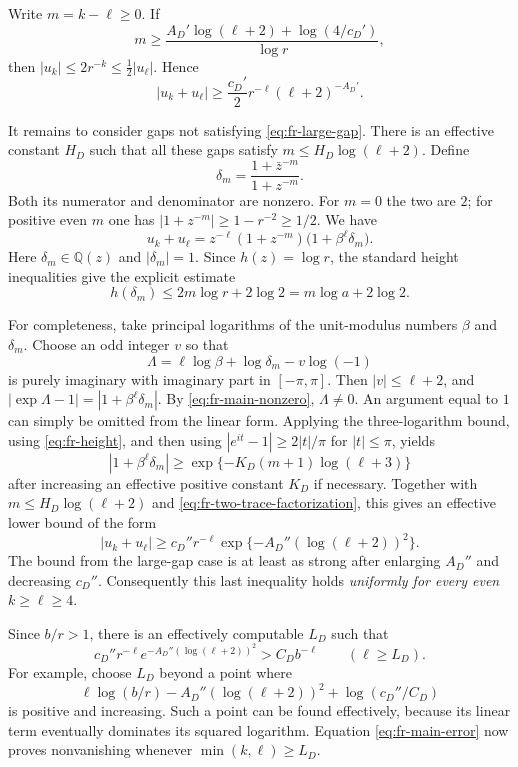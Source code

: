 \documentclass[11pt]{article}
\begin{document}
Write $m=k-\ell\geq0$.  If
\begin{equation}
\label{eq:fr-large-gap}
 m\geq\frac{A_D'\log(\ell+2)+\log(4/c_D')}{\log r},
\end{equation}
then $|u_k|\leq2r^{-k}\leq\tfrac12|u_\ell|$.  Hence
\[
 |u_k+u_\ell|
 \geq\frac{c_D'}2r^{-\ell}(\ell+2)^{-A_D'}.
\]

It remains to consider gaps not satisfying \eqref{eq:fr-large-gap}.
There is an effective constant $H_D$ such that all these gaps satisfy
$m\leq H_D\log(\ell+2)$.  Define
\[
 \delta_m=\frac{1+\bar z^{-m}}{1+z^{-m}}.
\]
Both its numerator and denominator are nonzero.  For $m=0$ the two
are $2$; for positive even $m$ one has
$|1+z^{-m}|\geq1-r^{-2}\geq1/2$.  We have
\begin{equation}
\label{eq:fr-two-trace-factorization}
 u_k+u_\ell
 =z^{-\ell}(1+z^{-m})\bigl(1+\beta^\ell\delta_m\bigr).
\end{equation}
Here $\delta_m\in\mathbb Q(z)$ and $|\delta_m|=1$.
Since $h(z)=\log r$, the standard height inequalities give the explicit
estimate
\begin{equation}
\label{eq:fr-height}
 h(\delta_m)\leq2m\log r+2\log2
 =m\log a+2\log2.
\end{equation}

For completeness, take principal logarithms of the unit-modulus numbers
$\beta$ and $\delta_m$.  Choose an odd integer $v$ so that
\[
 \Lambda=\ell\log\beta+\log\delta_m-v\log(-1)
\]
is purely imaginary with imaginary part in $[-\pi,\pi]$.
Then $|v|\leq\ell+2$, and
$|\exp\Lambda-1|=|1+\beta^\ell\delta_m|$.
By \eqref{eq:fr-main-nonzero}, $\Lambda\ne0$.  An argument equal to
$1$ can simply be omitted from the linear form.  Applying the
three-logarithm bound, using \eqref{eq:fr-height}, and then using
$|e^{it}-1|\geq2|t|/\pi$ for $|t|\leq\pi$, yields
\[
 |1+\beta^\ell\delta_m|
 \geq \exp\{-K_D(m+1)\log(\ell+3)\}
\]
after increasing an effective positive constant $K_D$ if necessary.
Together with $m\leq H_D\log(\ell+2)$ and
\eqref{eq:fr-two-trace-factorization}, this gives an effective lower
bound of the form
\[
 |u_k+u_\ell|
 \geq c_D''r^{-\ell}
 \exp\{-A_D''(\log(\ell+2))^2\}.
\]
The bound from the large-gap case is at least as strong after enlarging
$A_D''$ and decreasing $c_D''$.  Consequently this last inequality
holds \emph{uniformly for every even $k\geq\ell\geq4$}.

Since $b/r>1$, there is an effectively computable $L_D$ such that
\[
 c_D''r^{-\ell}e^{-A_D''(\log(\ell+2))^2}
 >C_Db^{-\ell}\qquad(\ell\geq L_D).
\]
For example, choose $L_D$ beyond a point where
\[
 \ell\log(b/r)-A_D''(\log(\ell+2))^2
 +\log(c_D''/C_D)
\]
is positive and increasing.  Such a point can be found effectively,
because its linear term eventually dominates its squared logarithm.
Equation \eqref{eq:fr-main-error} now proves nonvanishing whenever
$\min(k,\ell)\geq L_D$.
\end{document}
